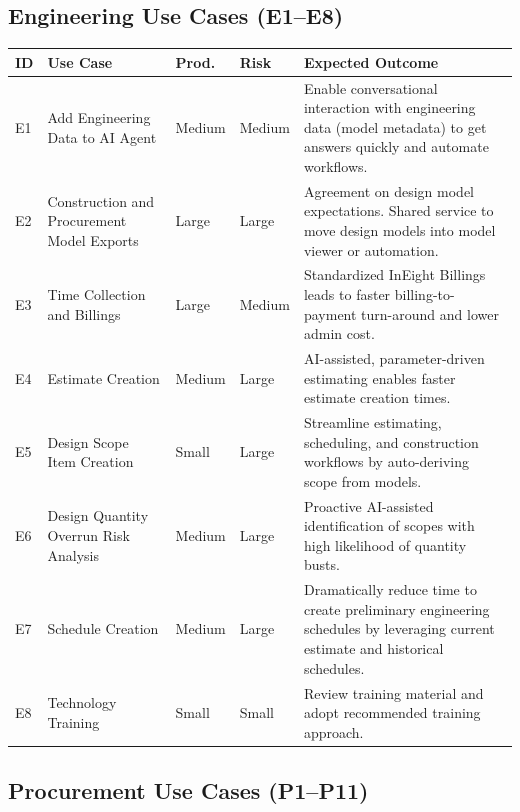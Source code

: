 \documentclass[11pt, letterpaper]{article}
\begin{document}
\vspace{1em}

\subsection*{Engineering Use Cases (E1--E8)}

{\footnotesize
\setlength{\tabcolsep}{4pt}
\begin{tabularx}{\textwidth}{@{} >{\raggedright\arraybackslash}p{0.9cm} >{\raggedright\arraybackslash}p{3.8cm} >{\raggedright\arraybackslash}p{1.3cm} >{\raggedright\arraybackslash}p{1.3cm} X @{}}
\toprule
\textbf{ID} & \textbf{Use Case} & \textbf{Prod.} & \textbf{Risk} & \textbf{Expected Outcome} \\
\midrule
E1 & Add Engineering Data to AI Agent & Medium & Medium & Enable conversational interaction with engineering data (model metadata) to get answers quickly and automate workflows. \\
\midrule
E2 & Construction and Procurement Model Exports & Large & Large & Agreement on design model expectations. Shared service to move design models into model viewer or automation. \\
\midrule
E3 & Time Collection and Billings & Large & Medium & Standardized InEight Billings leads to faster billing-to-payment turn-around and lower admin cost. \\
\midrule
E4 & Estimate Creation & Medium & Large & AI-assisted, parameter-driven estimating enables faster estimate creation times. \\
\midrule
E5 & Design Scope Item Creation & Small & Large & Streamline estimating, scheduling, and construction workflows by auto-deriving scope from models. \\
\midrule
E6 & Design Quantity Overrun Risk Analysis & Medium & Large & Proactive AI-assisted identification of scopes with high likelihood of quantity busts. \\
\midrule
E7 & Schedule Creation & Medium & Large & Dramatically reduce time to create preliminary engineering schedules by leveraging current estimate and historical schedules. \\
\midrule
E8 & Technology Training & Small & Small & Review training material and adopt recommended training approach. \\
\bottomrule
\end{tabularx}
}

\vspace{1em}

\subsection*{Procurement Use Cases (P1--P11)}
\end{document}
